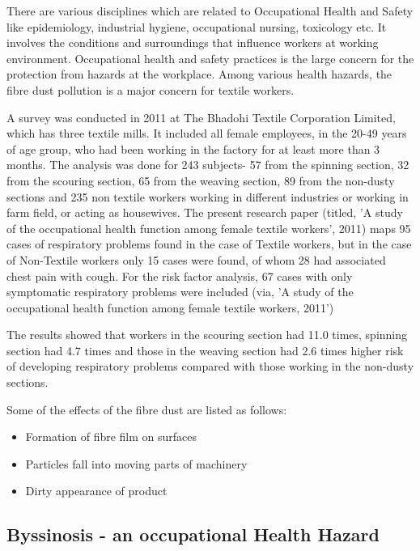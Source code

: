 \documentclass[journal]{IEEEtran}
\begin{document}
There are various disciplines which are related to Occupational Health and Safety like epidemiology, industrial hygiene, occupational nursing, toxicology etc. It involves the conditions and surroundings that influence workers at working environment. Occupational health and safety practices is the large concern for the protection from hazards at the workplace. Among various health hazards,  the fibre dust pollution is a major concern for textile workers.

\par 
A survey was conducted in 2011 at The Bhadohi Textile Corporation Limited, which has three textile mills. It included all female employees, in the 20-49 years of age group, who had been working in the factory for at least more than 3 months. 
The analysis was done for 243 subjects- 57 from the spinning section, 32 from
the scouring section, 65 from the weaving section, 89 from the non-dusty sections and 235 non textile workers working in different industries or working in farm field, or acting as housewives. The present research paper (titled, 'A study of the occupational health function among female textile workers', 2011) maps 95 cases of respiratory problems found in the case of Textile workers, but in the case of Non-Textile workers only 15 cases were found, of whom 28 had associated chest pain with cough. For the risk factor analysis, 67 cases with only symptomatic respiratory problems were included (via, 'A study of the occupational health function among female textile workers, 2011') 

\par
The results showed that workers in the scouring section had 11.0 times, spinning section had 4.7 times and those in the weaving section had 2.6 times higher risk of developing respiratory problems compared with those working in the non-dusty sections.

\par
Some of the effects of the fibre dust are listed as follows: 
\begin{itemize}
    \item Formation of fibre film on surfaces 
    \item Particles fall into moving parts of machinery
    \item Dirty appearance of product
\end{itemize}

\subsection{Byssinosis - an occupational Health Hazard}
\end{document}

